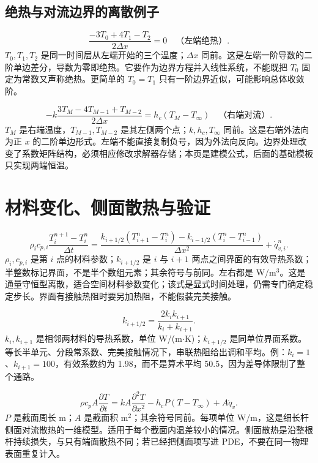\documentclass[UTF8,zihao=-4,openany,oneside,fontset=windows]{ctexbook}
\begin{document}
\subsection{绝热与对流边界的离散例子}
\begin{equation}
\frac{-3T_0+4T_1-T_2}{2\Delta x}=0\quad\text{（左端绝热）}.
\end{equation}
$T_0,T_1,T_2$ 是同一时间层从左端开始的三个温度；$\Delta x$ 同前。这是左端一阶导数的二阶单边差分，导数为零即绝热。它要作为边界方程并入线性系统，不能既把 $T_0$ 固定为常数又声称绝热。更简单的 $T_0=T_1$ 只有一阶边界近似，可能影响总体收敛阶。

\begin{equation}
-k\frac{3T_M-4T_{M-1}+T_{M-2}}{2\Delta x}
=h_c(T_M-T_\infty)\quad\text{（右端对流）}.
\end{equation}
$T_M$ 是右端温度，$T_{M-1},T_{M-2}$ 是其左侧两个点；$k,h_c,T_\infty$ 同前。这是右端外法向为正 $x$ 的二阶单边形式。左端不能直接复制负号，因为外法向反向。边界处理改变了系数矩阵结构，必须相应修改求解器存储；本页是建模公式，后面的基础模板只实现两端恒温。

\section{材料变化、侧面散热与验证}
\begin{equation}
\rho_i c_{p,i}\frac{T_i^{n+1}-T_i^n}{\Delta t}
=\frac{k_{i+1/2}(T_{i+1}^n-T_i^n)-k_{i-1/2}(T_i^n-T_{i-1}^n)}{\Delta x^2}+\dot q_{v,i}^n.
\end{equation}
$\rho_i,c_{p,i}$ 是第 $i$ 点的材料参数；$k_{i+1/2}$ 是 $i$ 与 $i+1$ 两点之间界面的有效导热系数；半整数标记界面，不是半个数组元素；其余符号与前同。左右都是 W/m$^3$。这是通量守恒型离散，适合空间材料参数变化；该式是显式时间处理，仍需专门确定稳定步长。界面有接触热阻时要另加热阻，不能假装完美接触。

\begin{equation}
k_{i+1/2}=\frac{2k_i k_{i+1}}{k_i+k_{i+1}}.
\end{equation}
$k_i,k_{i+1}$ 是相邻两材料的导热系数，单位 W/(m$\cdot$K)；$k_{i+1/2}$ 是同单位界面系数。等长半单元、分段常系数、完美接触情况下，串联热阻给出调和平均。例：$k_i=1$、$k_{i+1}=100$，有效系数约为 1.98，而不是算术平均 50.5，因为差导体限制了整个通路。

\begin{equation}
\rho c_p A\frac{\partial T}{\partial t}
=kA\frac{\partial^2T}{\partial x^2}-h_cP(T-T_\infty)+A\dot q_v.
\end{equation}
$P$ 是截面周长 m；$A$ 是截面积 m$^2$；其余符号同前。每项单位 W/m，这是细长杆侧面对流散热的一维模型。适用于每个截面内温差较小的情况。侧面散热是沿整根杆持续损失，与只有端面散热不同；若已经把侧面项写进 PDE，不要在同一物理表面重复计入。
\end{document}
